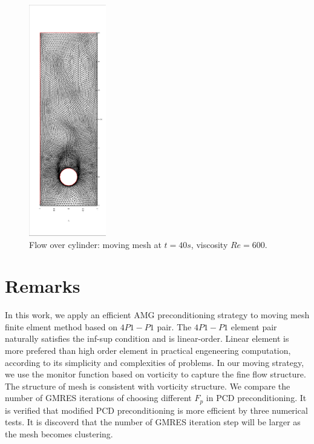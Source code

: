 \documentclass{eajam}
\begin{document}
      \begin{figure}[!htbp]
        \centering
        \includegraphics[width = 0.3\textwidth, angle = -90]{picture/obstacle_flow_data/mesh_t_40s.eps}
        \caption{\small Flow over cylinder: moving mesh at $t = 40s$,
          viscosity $Re = 600$.}
        \label{fig::cylinder_mesh_40s}
      \end{figure}


\section{Remarks}
   \label{sec6} In this work, we apply an efficient AMG
   preconditioning strategy to moving mesh finite elment method based
   on $4P1-P1$ pair. The $4P1-P1$ element pair naturally satisfies the
   inf-sup condition and is linear-order. 
   Linear element is more prefered than high order element in
   practical engeneering computation, according to its simplicity and
   complexities of problems. In our moving strategy, we use the
   monitor function based on vorticity to capture the fine flow
   structure. The structure of mesh is consistent with vorticity
   structure. We compare the number of GMRES iterations of choosing
   different $F_p$ in PCD preconditioning. It is verified that
   modified PCD preconditioning is more efficient by three numerical
   tests. It is discoverd that the number of GMRES iteration step will
   be larger as the mesh becomes clustering. 
   
\end{document}
